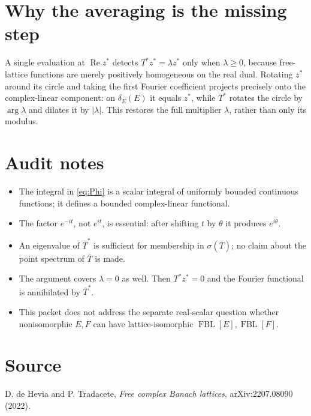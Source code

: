 \documentclass[11pt]{article}
\begin{document}
\section*{Why the averaging is the missing step}
A single evaluation at $\operatorname{Re}z^*$ detects $T^*z^*=\lambda z^*$ only when $\lambda\geq0$, because free-lattice functions are merely positively homogeneous on the real dual.  Rotating $z^*$ around its circle and taking the first Fourier coefficient projects precisely onto the complex-linear component: on $\delta_E(E)$ it equals $z^*$, while $T^*$ rotates the circle by $\arg\lambda$ and dilates it by $|\lambda|$.  This restores the full multiplier $\lambda$, rather than only its modulus.

\section*{Audit notes}
\begin{itemize}[leftmargin=1.4em,itemsep=2pt]
\item The integral in \eqref{eq:Phi} is a scalar integral of uniformly bounded continuous functions; it defines a bounded complex-linear functional.
\item The factor $e^{-it}$, not $e^{it}$, is essential: after shifting $t$ by $\theta$ it produces $e^{i\theta}$.
\item An eigenvalue of $\overline T^*$ is sufficient for membership in $\sigma(\overline T)$; no claim about the point spectrum of $\overline T$ is made.
\item The argument covers $\lambda=0$ as well.  Then $T^*z^*=0$ and the Fourier functional is annihilated by $\overline T^*$.
\item This packet does not address the separate real-scalar question whether nonisomorphic $E,F$ can have lattice-isomorphic $\operatorname{FBL}[E],\operatorname{FBL}[F]$.
\end{itemize}

\section*{Source}
D. de Hevia and P. Tradacete, \emph{Free complex Banach lattices}, arXiv:2207.08090 (2022).
\end{document}
